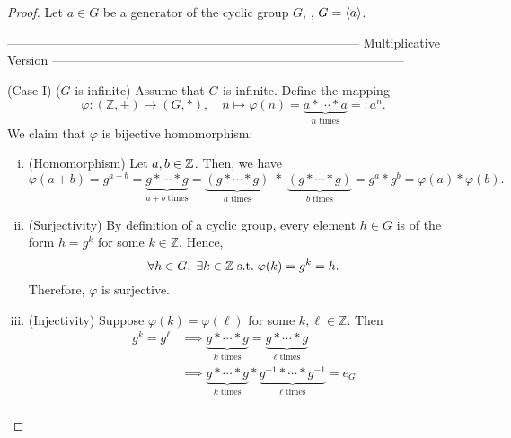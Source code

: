 \documentclass[11pt,openany]{article}
\begin{document}
\newpage
{}
\begin{proof}
	Let \( a \in G \) be a generator of the cyclic group \(G\), \ie, $G=\langle a \rangle$. \\
	\begin{center}
	\ttfamily ------------------------------------------------------------------------------------ Multiplicative Version ------------------------------------------------------------------------------------
	\end{center}
	(Case I) ($G$ is infinite) Assume that $G$ is infinite.
		Define the mapping \[
	\varphi : (\mathbb{Z}, +) \to (G, \ast),\quad n\mapsto \varphi(n) = \underbrace{a\ast\cdots\ast a}_{n\; \text{times}}=:a^n.
	\] We claim that $\varphi$ is bijective homomorphism: \begin{enumerate}[(i)]
		\item (Homomorphism)\;  Let $a,b\in\mathbb{Z}$. Then, we have \[
		\varphi(a+b)=g^{a+b}=\underbrace{g\ast\cdots\ast g}_{a+b\; \text{times}}=\underbrace{(g\ast\cdots\ast g)}_{a\; \text{times}}\;\ast\;\underbrace{(g\ast\cdots\ast g)}_{b\; \text{times}}=g^a\ast g^b = \varphi(a)\ast\varphi(b).
		\]
		\item (Surjectivity)\; By definition of a cyclic group, every element \(h\in G\) is of the form \(h=g^k\) for some \(k\in \mathbb{Z}\). Hence, \[
		\forall h\in G,\; \exists k\in\mathbb{Z}\; \text{s.t.}\; \varphi(k)=g^k = h.
		\] Therefore, \(\varphi\) is surjective.
		\item (Injectivity)\; Suppose \(\varphi(k)=\varphi(\ell)\) for some \(k,\ell\in \mathbb{Z}\). Then \begin{align*}
			g^k=g^\ell&\implies \underbrace{g\ast\cdots\ast g}_{k\; \text{times}}=\underbrace{g\ast\cdots\ast g}_{\ell\; \text{times}}\\
			&\implies \underbrace{g\ast\cdots\ast g}_{k\; \text{times}}\ast \underbrace{g^{-1}\ast\cdots\ast g^{-1}}_{\ell\; \text{times}}=e_G \\

\end{align*}
\end{enumerate}
\end{proof}
\end{document}
